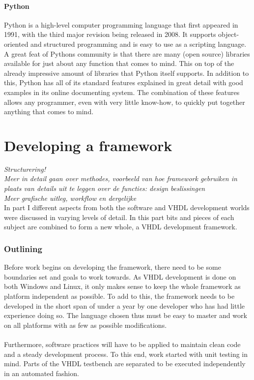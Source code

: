 \documentclass[11pt,british]{article}
\begin{document}
\subsection{Python}
Python is a high-level computer programming language that first appeared in 1991, with the third major revision being released in 2008. It supports object-oriented and structured programming and is easy to use as a scripting language. A great feat of Pythons community is that there are many (open source) libraries available for just about any function that comes to mind. This on top of the already impressive amount of libraries that Python itself supports. In addition to this, Python has all of its standard features explained in great detail with good examples in its online documenting system. The combination of these features allows any programmer, even with very little know-how, to quickly put together anything that comes to mind.


\newpage
\part{Developing a framework}
\emph{\color{red}Structurering!}\\
\emph{\color{red}Meer in detail gaan over methodes, voorbeeld van hoe framework gebruiken in plaats van details uit te leggen over de functies: design beslissingen}\\
\emph{\color{red}Meer grafische uitleg, workflow en dergelijke}\\
In part I different aspects from both the software and \gls{VHDL} development worlds were discussed in  varying levels of detail. In this part bits and pieces of each subject are combined to form a new whole, a VHDL development framework.

\section{Outlining}
\label{sec:outlining}
Before work begins on developing the framework, there need to be some boundaries set and goals to work towards. As VHDL development is done on both Windows and Linux, it only makes sense to keep the whole framework as platform independent as possible. To add to this, the framework needs to be developed in the short span of under a year by one developer who has had little experience doing so. The language chosen thus must be easy to master and work on all platforms with as few as possible modifications.\\
\\
Furthermore, software practices will have to be applied to maintain clean code and a steady development process. To this end, work started with unit testing in mind. Parts of the VHDL testbench are separated to be executed independently in an automated fashion.
\end{document}
